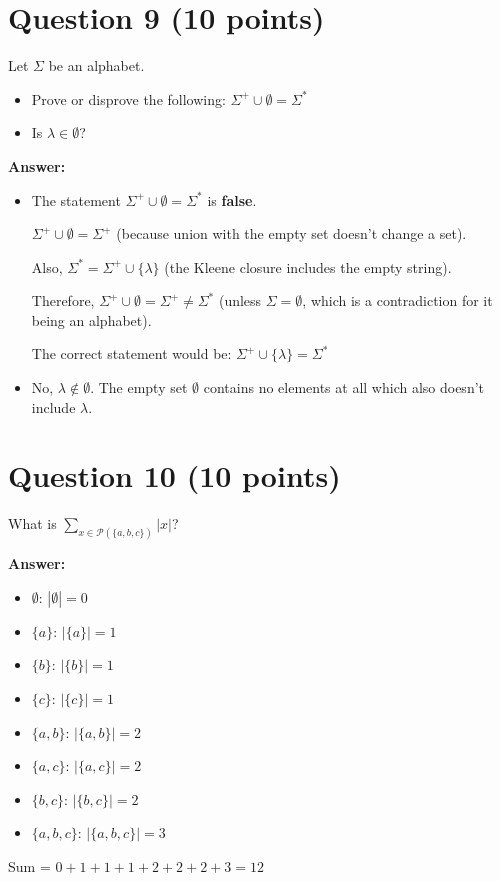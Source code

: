 \documentclass[12pt]{article}
\begin{document}
\section*{Question 9 (10 points)}
Let $\Sigma$ be an alphabet.
\begin{itemize}
    \item Prove or disprove the following: $\Sigma^+ \cup \emptyset = \Sigma^*$
    \item Is $\lambda \in \emptyset$?
\end{itemize}

\textbf{Answer:}
\begin{itemize}
    \item The statement $\Sigma^+ \cup \emptyset = \Sigma^*$ is \textbf{false}.
    
     $\Sigma^+ \cup \emptyset = \Sigma^+$ (because union with the empty set doesn't change a set).
    
    Also, $\Sigma^* = \Sigma^+ \cup \{\lambda\}$ (the Kleene closure includes the empty string).
    
    Therefore, $\Sigma^+ \cup \emptyset = \Sigma^+ \neq \Sigma^*$ (unless $\Sigma = \emptyset$, which is a contradiction for it being an alphabet).
    
    The correct statement would be: $\Sigma^+ \cup \{\lambda\} = \Sigma^*$
    
    \item No, $\lambda \notin \emptyset$. The empty set $\emptyset$ contains no elements at all which also doesn't include $\lambda$.
\end{itemize}

\section*{Question 10 (10 points)}
What is $\sum_{x \in \mathcal{P}(\{a,b,c\})} |x|$?

\textbf{Answer:}
\begin{itemize}
    \item $\emptyset$: $|\emptyset| = 0$
    \item $\{a\}$: $|\{a\}| = 1$
    \item $\{b\}$: $|\{b\}| = 1$
    \item $\{c\}$: $|\{c\}| = 1$
    \item $\{a, b\}$: $|\{a, b\}| = 2$
    \item $\{a, c\}$: $|\{a, c\}| = 2$
    \item $\{b, c\}$: $|\{b, c\}| = 2$
    \item $\{a, b, c\}$: $|\{a, b, c\}| = 3$
\end{itemize}

Sum = $0 + 1 + 1 + 1 + 2 + 2 + 2 + 3 = 12$
\end{document}
